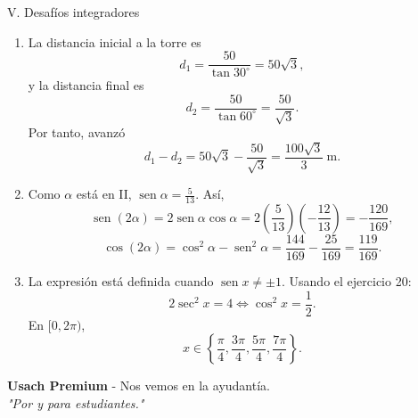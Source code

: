 \documentclass[letterpaper,12pt]{article}
\newcommand{\seno}{\operatorname{sen}}
\begin{document}
\begin{solbox}{V. Desafíos integradores}
\begin{enumerate}[label=\color{azulFuerte}\textbf{\arabic*.},leftmargin=*,start=31,itemsep=1em]
    \item La distancia inicial a la torre es
    \[
        d_1=\frac{50}{\tan30^\circ}=50\sqrt3,
    \]
    y la distancia final es
    \[
        d_2=\frac{50}{\tan60^\circ}=\frac{50}{\sqrt3}.
    \]
    Por tanto, avanzó
    \[
        d_1-d_2
        =50\sqrt3-\frac{50}{\sqrt3}
        =\boxed{\frac{100\sqrt3}{3}\ \text{m}}.
    \]

    \item Como \(\alpha\) está en II, \(\seno\alpha=\frac5{13}\). Así,
    \[
        \seno(2\alpha)=2\seno\alpha\cos\alpha
        =2\left(\frac5{13}\right)\left(-\frac{12}{13}\right)
        =\boxed{-\frac{120}{169}},
    \]
    \[
        \cos(2\alpha)=\cos^2\alpha-\seno^2\alpha
        =\frac{144}{169}-\frac{25}{169}
        =\boxed{\frac{119}{169}}.
    \]

    \item La expresión está definida cuando \(\seno x\neq\pm1\). Usando el ejercicio 20:
    \[
        2\sec^2x=4
        \iff
        \cos^2x=\frac12.
    \]
    En \([0,2\pi)\),
    \[
        \boxed{x\in\left\{
        \frac{\pi}{4},\frac{3\pi}{4},
        \frac{5\pi}{4},\frac{7\pi}{4}
        \right\}}.
    \]
\end{enumerate}
\end{solbox}

\vspace{0.8cm}
\begin{center}
    \small\textbf{Usach Premium} - Nos vemos en la ayudantía.\\
    \textit{"Por y para estudiantes."}
\end{center}
\end{document}
